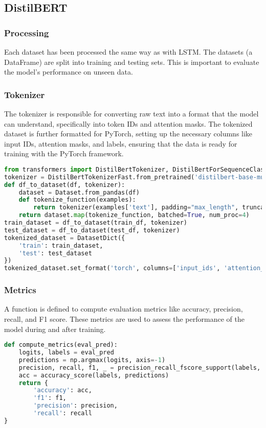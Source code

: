 \documentclass[11pt]{article}
\begin{document}
\subsection{DistilBERT}
\subsubsection{Processing}
Each dataset has been processed the same way as with LSTM. The datasets (a DataFrame) are split into training and testing sets. This is important to evaluate the model's performance on unseen data.
\subsubsection{Tokenizer}
The tokenizer is responsible for converting raw text into a format that the model can understand, specifically into token IDs and attention masks. The tokenized dataset is further formatted for PyTorch, setting up the necessary columns like input IDs, attention masks, and labels, ensuring that the data is ready for training with the PyTorch framework.

\begin{lstlisting}[language=Python, caption=Code used for tokenizing]
from transformers import DistilBertTokenizer, DistilBertForSequenceClassification
tokenizer = DistilBertTokenizerFast.from_pretrained('distilbert-base-multilingual-cased')
def df_to_dataset(df, tokenizer):
    dataset = Dataset.from_pandas(df)
    def tokenize_function(examples):
        return tokenizer(examples['text'], padding="max_length", truncation=True, max_length=512)
    return dataset.map(tokenize_function, batched=True, num_proc=4)
train_dataset = df_to_dataset(train_df, tokenizer)
test_dataset = df_to_dataset(test_df, tokenizer)
tokenized_dataset = DatasetDict({
    'train': train_dataset,
    'test': test_dataset
})
tokenized_dataset.set_format('torch', columns=['input_ids', 'attention_mask', 'labels'])
\end{lstlisting}

\subsubsection{Metrics}
A function is defined to compute evaluation metrics like accuracy, precision, recall, and F1 score. These metrics are used to assess the performance of the model during and after training.
\begin{lstlisting}[language=Python, caption=Code for computing metrics]
def compute_metrics(eval_pred):
    logits, labels = eval_pred
    predictions = np.argmax(logits, axis=-1)
    precision, recall, f1, _ = precision_recall_fscore_support(labels, predictions, average='weighted')
    acc = accuracy_score(labels, predictions)
    return {
        'accuracy': acc,
        'f1': f1,
        'precision': precision,
        'recall': recall
}
\end{lstlisting}
\end{document}
